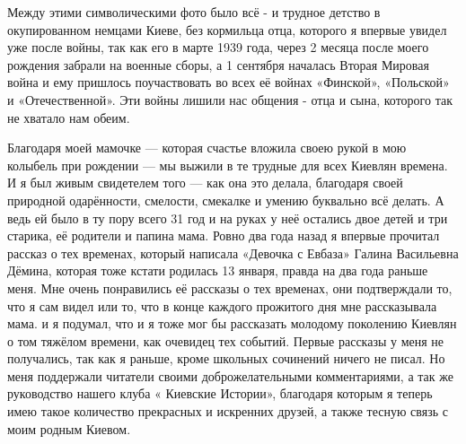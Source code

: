 \begin{multicols}{3}




\end{multicols} %

Между этими символическими фото  было всё - и трудное детство в окупированном
немцами Киеве, без кормильца отца, которого я впервые увидел уже после войны,
так как его в марте 1939 года, через 2 месяца после моего рождения забрали на
военные сборы, а  1 сентября началась Вторая Мировая война и ему пришлось
поучаствовать  во всех её войнах «Финской», «Польской» и «Отечественной». Эти
войны лишили нас общения - отца и сына, которого так не  хватало нам обеим.

Благодаря моей мамочке — которая счастье вложила своею рукой в мою колыбель при
рождении — мы выжили в те трудные для всех Киевлян времена.  И я был живым
свидетелем того — как она это делала, благодаря своей природной одарённости,
смелости, смекалке и умению  буквально всё делать. А ведь ей было  в ту пору
всего 31 год и на руках у неё остались двое детей и три старика, её родители и
папина мама. Ровно два года назад я впервые прочитал рассказ о тех временах,
который написала «Девочка с Евбаза» Галина Васильевна  Дёмина, которая тоже
кстати родилась 13 января, правда на два года раньше меня. Мне очень
понравились её рассказы  о тех временах, они подтверждали то, что я сам видел
или то, что в конце каждого прожитого дня мне рассказывала мама. и я подумал,
что и я  тоже мог бы  рассказать молодому поколению Киевлян  о том тяжёлом
времени, как очевидец тех событий. Первые рассказы у меня не получались,  так
как я раньше, кроме школьных сочинений ничего не писал. Но меня поддержали
читатели  своими доброжелательными комментариями, а так же руководство нашего
клуба « Киевские Истории», благодаря которым я теперь имею такое количество
прекрасных и искренних  друзей, а также тесную  связь с моим родным Киевом.

